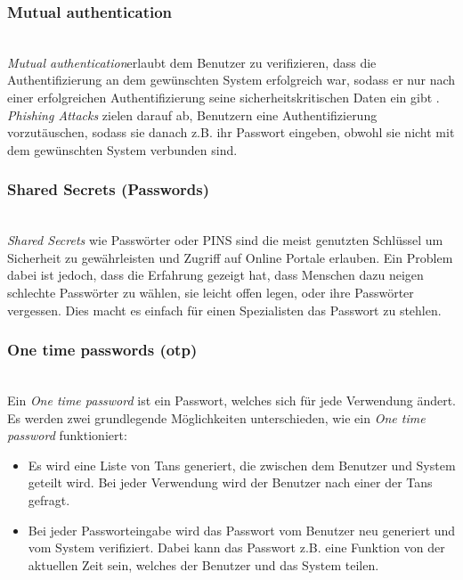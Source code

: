 \subsubsection{Mutual authentication}\hspace*{\fill} \\
\textit{Mutual authentication}erlaubt dem Benutzer zu verifizieren, dass die Authentifizierung an dem gewünschten System erfolgreich war, sodass er nur nach einer erfolgreichen Authentifizierung seine sicherheitskritischen Daten ein gibt \cite{yang2008two}. \textit{Phishing Attacks} zielen darauf ab, Benutzern eine Authentifizierung  vorzutäuschen, sodass sie danach z.B. ihr Passwort eingeben, obwohl sie nicht mit dem gewünschten System verbunden sind.


\subsubsection{Shared Secrets (Passwords)}\hspace*{\fill} \\
\textit{Shared Secrets} wie Passwörter oder PINS sind die meist genutzten Schlüssel um Sicherheit zu gewährleisten und Zugriff auf Online Portale erlauben. Ein Problem dabei ist jedoch, dass die Erfahrung gezeigt hat, dass Menschen dazu neigen schlechte Passwörter zu wählen, sie leicht offen legen, oder ihre Passwörter vergessen. Dies macht es einfach für einen Spezialisten das Passwort zu stehlen. 
\subsubsection{One time passwords (otp)}\hspace*{\fill} \\
Ein \textit{One time password} ist ein Passwort, welches sich für jede Verwendung ändert. Es werden zwei grundlegende Möglichkeiten unterschieden, wie ein \textit{One time password} funktioniert:
\begin{itemize}
\item Es wird eine Liste von Tans generiert, die zwischen dem Benutzer und System geteilt wird. Bei jeder Verwendung wird der Benutzer nach einer der Tans gefragt.
\item Bei jeder Passworteingabe wird das Passwort vom Benutzer neu generiert und vom System verifiziert. Dabei kann das Passwort z.B. eine Funktion von der aktuellen Zeit sein, welches der Benutzer und das System teilen.
\end{itemize}
